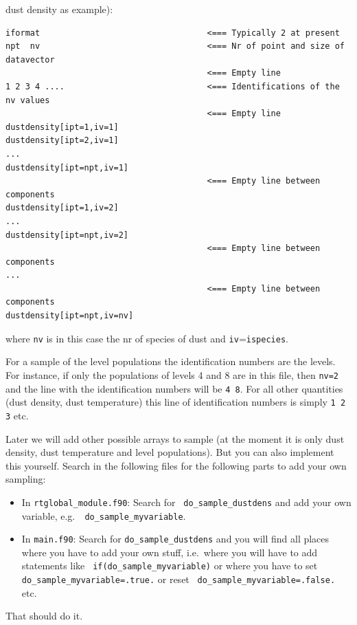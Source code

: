 \documentclass{report}
\newenvironment{asciibox}%
  {\begin{list}{}{%
    \setlength{\topsep}{0.5em}%
    \setlength{\parskip}{0em}%
    \setlength{\parsep}{0em}%
    \setlength{\itemsep}{0em}%
    \setlength{\rightmargin}{0em}%
    \setlength{\leftmargin}{3.0em}%
    \setlength{\labelsep}{1em}%
    \setlength{\labelwidth}{2em}%
  }\normalfont\footnotesize\item}
  {\end{list}}
\begin{document}
dust density as example):
\begin{asciibox}\begin{verbatim}
iformat                                  <=== Typically 2 at present
npt  nv                                  <=== Nr of point and size of datavector
                                         <=== Empty line
1 2 3 4 ....                             <=== Identifications of the nv values 
                                         <=== Empty line
dustdensity[ipt=1,iv=1]
dustdensity[ipt=2,iv=1]
...
dustdensity[ipt=npt,iv=1]
                                         <=== Empty line between components
dustdensity[ipt=1,iv=2]
...
dustdensity[ipt=npt,iv=2]
                                         <=== Empty line between components
...
                                         <=== Empty line between components
dustdensity[ipt=npt,iv=nv]
\end{verbatim}\end{asciibox}
where {\small\tt nv} is in this case the nr of species of dust and 
{\small\tt iv}={\small\tt ispecies}.

For a sample of the level populations the identification numbers are the
levels. For instance, if only the populations of levels 4 and 8 are in this
file, then {\small\tt nv=2} and the line with the identification numbers
will be {\small\tt 4 8}. For all other quantities (dust density, dust
temperature) this line of identification numbers is simply {\small\tt 1 2 3}
etc.

Later we will add other possible arrays to sample (at the moment it is only
dust density, dust temperature and level populations). But you can also
implement this yourself. Search in the following files for the following
parts to add your own sampling:
\begin{itemize}
\item In {\small\tt rtglobal\_module.f90}: Search for {\small\tt 
do\_sample\_dustdens} and add your own variable, e.g.\ {\small\tt
do\_sample\_myvariable}.
\item In {\small\tt main.f90}: Search for {\small\tt do\_sample\_dustdens}
  and you will find all places where you have to add your own stuff, i.e.\
  where you will have to add statements like {\small\tt
    if(do\_sample\_myvariable)} or where you have to set {\small\tt
    do\_sample\_myvariable=.true.} or reset {\small\tt
    do\_sample\_myvariable=.false.} etc. 
\end{itemize}
That should do it.

\end{document}
